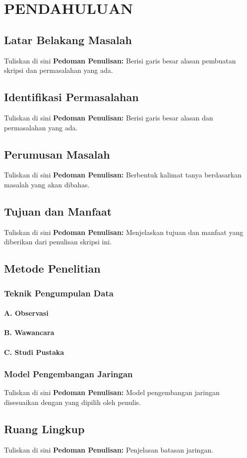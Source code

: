 \chapter{PENDAHULUAN}
\section{Latar Belakang Masalah}


Tuliskan di sini \textbf{Pedoman Penulisan:} Berisi garis besar alasan pembuatan skripsi dan permasalahan yang ada.


\section{Identifikasi Permasalahan}


Tuliskan di sini \textbf{Pedoman Penulisan:} Berisi garis besar alasan dan permasalahan yang ada.


\section{Perumusan Masalah}


Tuliskan di sini \textbf{Pedoman Penulisan:} Berbentuk kalimat tanya berdasarkan masalah yang akan dibahas.


\section{Tujuan dan Manfaat}


Tuliskan di sini \textbf{Pedoman Penulisan:} Menjelaskan tujuan dan manfaat yang diberikan dari penulisan skripsi ini.


\section{Metode Penelitian}
\subsection{Teknik Pengumpulan Data}
\subsubsection*{A. Observasi}
\subsubsection*{B. Wawancara}
\subsubsection*{C. Studi Pustaka}
\subsection{Model Pengembangan Jaringan}


Tuliskan di sini \textbf{Pedoman Penulisan:} Model pengembangan jaringan disesuaikan dengan yang dipilih oleh penulis.


\section{Ruang Lingkup}


Tuliskan di sini \textbf{Pedoman Penulisan:} Penjelasan batasan jaringan.


